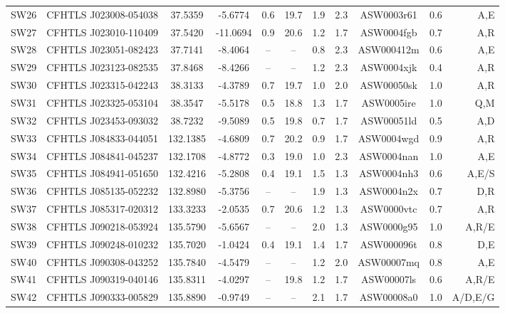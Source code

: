 \documentclass[useAMS,usenatbib,a4paper]{mn2e}
\begin{document}
\begin{center}
\begin{longtable}{lcccccccccr}
SW26 & CFHTLS J023008-054038 &   37.5359 &   -5.6774 &  0.6 & 19.7 &  1.9 &  2.3 & ASW0003r61 &  0.6  &  A,E   \\ 
SW27 & CFHTLS J023010-110409 &   37.5420 &  -11.0694 &  0.9 & 20.6 &  1.2 &  1.7 & ASW0004fgb &  0.7  &  A,R   \\ 
SW28 & CFHTLS J023051-082423 &   37.7141 &   -8.4064 &  --  &  --  &  0.8 &  2.3 & ASW000412m &  0.6  &  A,E   \\ 
SW29 & CFHTLS J023123-082535 &   37.8468 &   -8.4266 &  --  &  --  &  1.2 &  2.3 & ASW0004xjk &  0.4  &  A,R   \\ 
SW30 & CFHTLS J023315-042243 &   38.3133 &   -4.3789 &  0.7 & 19.7 &  1.0 &  2.0 & ASW00050sk &  1.0  &  A,R   \\ 
SW31 & CFHTLS J023325-053104 &   38.3547 &   -5.5178 &  0.5 & 18.8 &  1.3 &  1.7 & ASW0005ire &  1.0  &  Q,M   \\ 
SW32 & CFHTLS J023453-093032 &   38.7232 &   -9.5089 &  0.5 & 19.8 &  0.7 &  1.7 & ASW00051ld &  0.5  &  A,D   \\ 
SW33 & CFHTLS J084833-044051 &  132.1385 &   -4.6809 &  0.7 & 20.2 &  0.9 &  1.7 & ASW0004wgd &  0.9  &  A,R   \\ 
SW34 & CFHTLS J084841-045237 &  132.1708 &   -4.8772 &  0.3 & 19.0 &  1.0 &  2.3 & ASW0004nan &  1.0  &  A,E   \\ 
SW35 & CFHTLS J084941-051650 &  132.4216 &   -5.2808 &  0.4 & 19.1 &  1.5 &  1.3 & ASW0004nh3 &  0.6  &  A,E/S   \\ 
SW36 & CFHTLS J085135-052232 &  132.8980 &   -5.3756 &  --  &  --  &  1.9 &  1.3 & ASW0004n2x &  0.7  &  D,R   \\ 
SW37 & CFHTLS J085317-020312 &  133.3233 &   -2.0535 &  0.7 & 20.6 &  1.2 &  1.3 & ASW0000vtc &  0.7  &  A,R   \\ 
SW38 & CFHTLS J090218-053924 &  135.5790 &   -5.6567 &  --  &  --  &  2.0 &  1.3 & ASW0000g95 &  1.0  &  A,R/E   \\ 
SW39 & CFHTLS J090248-010232 &  135.7020 &   -1.0424 &  0.4 & 19.1 &  1.4 &  1.7 & ASW000096t &  0.8  &  D,E   \\ 
SW40 & CFHTLS J090308-043252 &  135.7840 &   -4.5479 &  --  &  --  &  1.2 &  2.0 & ASW00007mq &  0.8  &  A,E   \\ 
SW41 & CFHTLS J090319-040146 &  135.8311 &   -4.0297 &  --  & 19.8 &  1.2 &  1.7 & ASW00007ls &  0.6  &  A,R/E   \\ 
SW42 & CFHTLS J090333-005829 &  135.8890 &   -0.9749 &  --  &  --  &  2.1 &  1.7 & ASW00008a0 &  1.0  &  A/D,E/G   \\ 

\end{longtable}
\end{center}
\end{document}
